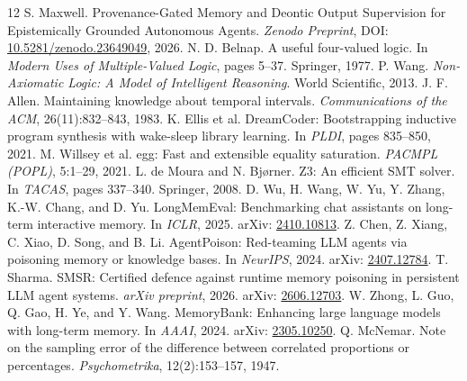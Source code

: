 \documentclass[11pt,a4paper]{article}
\begin{document}
\begin{thebibliography}{12}
 S. Maxwell. Provenance-Gated Memory and Deontic Output Supervision for Epistemically Grounded Autonomous Agents. \emph{Zenodo Preprint}, DOI: \href{https://doi.org/10.5281/zenodo.23649049}{10.5281/zenodo.23649049}, 2026.
 N. D. Belnap. A useful four-valued logic. In \emph{Modern Uses of Multiple-Valued Logic}, pages 5--37. Springer, 1977.
 P. Wang. \emph{Non-Axiomatic Logic: A Model of Intelligent Reasoning}. World Scientific, 2013.
 J. F. Allen. Maintaining knowledge about temporal intervals. \emph{Communications of the ACM}, 26(11):832--843, 1983.
 K. Ellis et al. DreamCoder: Bootstrapping inductive program synthesis with wake-sleep library learning. In \emph{PLDI}, pages 835--850, 2021.
 M. Willsey et al. egg: Fast and extensible equality saturation. \emph{PACMPL (POPL)}, 5:1--29, 2021.
 L. de Moura and N. Bj{\o}rner. Z3: An efficient SMT solver. In \emph{TACAS}, pages 337--340. Springer, 2008.
 D. Wu, H. Wang, W. Yu, Y. Zhang, K.-W. Chang, and D. Yu. LongMemEval: Benchmarking chat assistants on long-term interactive memory. In \emph{ICLR}, 2025. arXiv: \href{https://arxiv.org/abs/2410.10813}{2410.10813}.
 Z. Chen, Z. Xiang, C. Xiao, D. Song, and B. Li. AgentPoison: Red-teaming LLM agents via poisoning memory or knowledge bases. In \emph{NeurIPS}, 2024. arXiv: \href{https://arxiv.org/abs/2407.12784}{2407.12784}.
 T. Sharma. SMSR: Certified defence against runtime memory poisoning in persistent LLM agent systems. \emph{arXiv preprint}, 2026. arXiv: \href{https://arxiv.org/abs/2606.12703}{2606.12703}.
 W. Zhong, L. Guo, Q. Gao, H. Ye, and Y. Wang. MemoryBank: Enhancing large language models with long-term memory. In \emph{AAAI}, 2024. arXiv: \href{https://arxiv.org/abs/2305.10250}{2305.10250}.
 Q. McNemar. Note on the sampling error of the difference between correlated proportions or percentages. \emph{Psychometrika}, 12(2):153--157, 1947.
\end{thebibliography}
\end{document}
